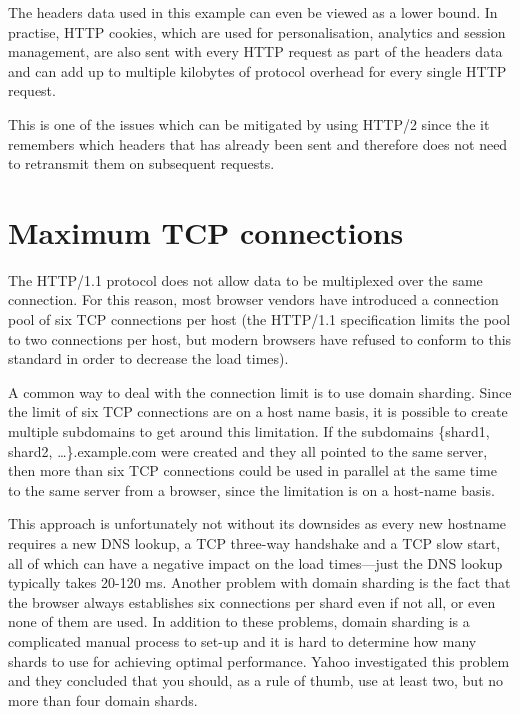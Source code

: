 \documentclass{cslthse-msc}
\begin{document}
The headers data used in this example can even be viewed as a lower bound. In practise, HTTP cookies, which are used for personalisation, analytics and session management, are also sent with every HTTP request as part of the headers data and can add up to multiple kilobytes of protocol overhead for every single HTTP request\cite[page 200]{HPBN}.

This is one of the issues which can be mitigated by using HTTP/2 since the it remembers which headers that has already been sent and therefore does not need to retransmit them on subsequent requests\cite[page 222]{HPBN}.

\section{Maximum TCP connections}
\label{max_tcp}
The HTTP/1.1 protocol does not allow data to be multiplexed over the same connection\cite[p.194]{HPBN}. For this reason, most browser vendors have introduced a connection pool of six TCP connections per host (the HTTP/1.1 specification limits the pool to two connections\cite{rfc2616} per host, but modern browsers have refused to conform to this standard in order to decrease the load times).

A common way to deal with the connection limit is to use domain sharding. Since the limit of six TCP connections are on a host name basis, it is possible to create multiple subdomains to get around this limitation. If the subdomains \{shard1, shard2, \ldots\}.example.com were created and they all pointed to the same server, then more than six TCP connections could be used in parallel at the same time to the same server from a browser, since the limitation is on a host-name basis.

This approach is unfortunately not without its downsides as every new hostname requires a new DNS lookup, a TCP three-way handshake and a TCP slow start, all of which can have a negative impact on the load times\cite[page 199]{HPBN}---just the DNS lookup typically takes 20-120 ms\cite[page 63]{HPWS}. Another problem with domain sharding is the fact that the browser always establishes six connections per shard even if not all, or even none of them are used. In addition to these problems, domain sharding is a complicated manual process to set-up and it is hard to determine how many shards to use for achieving optimal performance. Yahoo investigated this problem and they concluded that you should, as a rule of thumb, use at least two, but no more than four domain shards\cite{yahoo-performance-4}.
\end{document}
